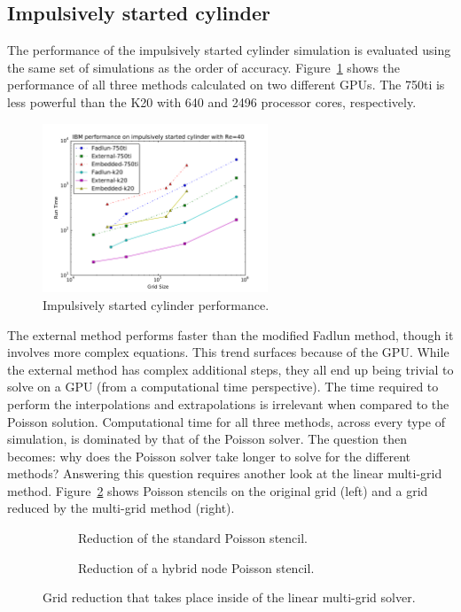 \subsection{Impulsively started cylinder}

The performance of the impulsively started cylinder simulation is evaluated using the same set of simulations as the order of accuracy. 
Figure~\ref{fig:cyperf} shows the performance of all three methods calculated on two different GPUs. 
The 750ti is less powerful than the K20 with 640 and 2496 processor cores, respectively.
\begin{figure}[!htb]
	\centering
	\includegraphics[width=0.6\textwidth]{cylinder_performance}
	\caption{Impulsively started cylinder performance.}
	\label{fig:cyperf}
\end{figure}
The external method performs faster than the modified Fadlun method, though it involves more complex equations.
This trend surfaces because of the GPU. 
While the external method has complex additional steps, they all end up being trivial to solve on a GPU (from a computational time perspective). 
The time required to perform the interpolations and extrapolations is irrelevant when compared to the Poisson solution. 
Computational time for all three methods, across every type of simulation, is dominated by that of the Poisson solver. 
The question then becomes: why does the Poisson solver take longer to solve for the different methods? 
Answering this question requires another look at the linear multi-grid method. 
Figure~\ref{fig:gridreduce} shows Poisson stencils on the original grid (left) and a grid reduced by the multi-grid method (right). 
\begin{figure}[!htb]
	\centering
	\begin{subfigure}{0.6\textwidth}
		
		\caption{Reduction of the standard Poisson stencil.}
	\end{subfigure}
	
	\begin{subfigure}{0.6\textwidth}
		
		\caption{Reduction of a hybrid node Poisson stencil.}
	\end{subfigure}
	\caption{Grid reduction that takes place inside of the linear multi-grid solver.}
	\label{fig:gridreduce}
\end{figure}
